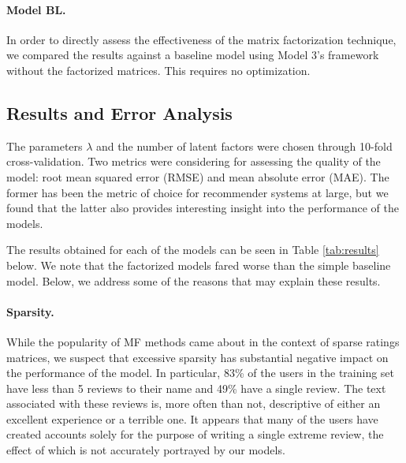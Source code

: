\documentclass[12pt]{article}
\begin{document}
\begin{multicols}{2}
\paragraph{Model BL.} In order to directly assess the effectiveness of the matrix factorization technique, we compared the results against a baseline model using Model 3's framework without the factorized matrices. This requires no optimization.

\subsection{Results and Error Analysis}
The parameters $\lambda$ and the number of latent factors were chosen through 10-fold cross-validation. Two metrics were considering for assessing the quality of the model: root mean squared error (RMSE) and mean absolute error (MAE). The former has been the metric of choice for recommender systems at large, but we found that the latter also provides interesting insight into the performance of the models. 

The results obtained for each of the models can be seen in Table \ref{tab:results} below. We note that the factorized models fared worse than the simple baseline model. Below, we address some of the reasons that may explain these results.

\paragraph{Sparsity.} While the popularity of MF methods came about in the context of sparse ratings matrices, we suspect that excessive sparsity has substantial negative impact on the performance of the model. In particular, 83\% of the users in the training set have less than 5 reviews to their name and 49\% have a single review. The text associated with these reviews is, more often than not, descriptive of either an excellent experience or a terrible one. It appears that many of the users have created accounts solely for the purpose of writing a single extreme review, the effect of which is not accurately portrayed by our models.


\end{multicols}
\end{document}
